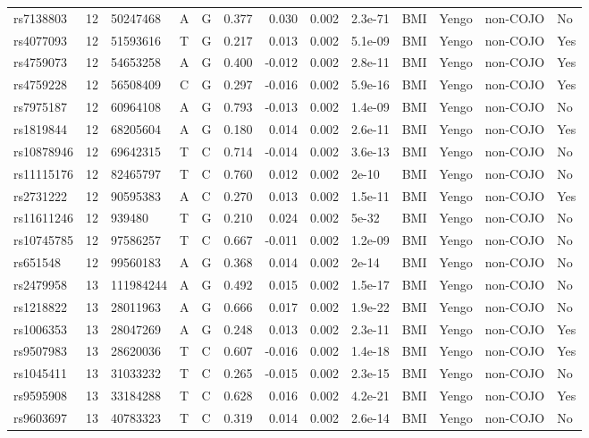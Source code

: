 \documentclass[11pt,twoside]{bristolthesis}
\begin{document}
\begin{longtable}[t]{lrlllrrrlllll}
rs7138803 & 12 & 50247468 & A & G & 0.377 & 0.030 & 0.002 & 2.3e-71 & BMI & Yengo & non-COJO & No\\
rs4077093 & 12 & 51593616 & T & G & 0.217 & 0.013 & 0.002 & 5.1e-09 & BMI & Yengo & non-COJO & Yes\\
rs4759073 & 12 & 54653258 & A & G & 0.400 & -0.012 & 0.002 & 2.8e-11 & BMI & Yengo & non-COJO & Yes\\
\addlinespace
rs4759228 & 12 & 56508409 & C & G & 0.297 & -0.016 & 0.002 & 5.9e-16 & BMI & Yengo & non-COJO & Yes\\
rs7975187 & 12 & 60964108 & A & G & 0.793 & -0.013 & 0.002 & 1.4e-09 & BMI & Yengo & non-COJO & No\\
rs1819844 & 12 & 68205604 & A & G & 0.180 & 0.014 & 0.002 & 2.6e-11 & BMI & Yengo & non-COJO & Yes\\
rs10878946 & 12 & 69642315 & T & C & 0.714 & -0.014 & 0.002 & 3.6e-13 & BMI & Yengo & non-COJO & No\\
rs11115176 & 12 & 82465797 & T & C & 0.760 & 0.012 & 0.002 & 2e-10 & BMI & Yengo & non-COJO & No\\
\addlinespace
rs2731222 & 12 & 90595383 & A & C & 0.270 & 0.013 & 0.002 & 1.5e-11 & BMI & Yengo & non-COJO & Yes\\
rs11611246 & 12 & 939480 & T & G & 0.210 & 0.024 & 0.002 & 5e-32 & BMI & Yengo & non-COJO & No\\
rs10745785 & 12 & 97586257 & T & C & 0.667 & -0.011 & 0.002 & 1.2e-09 & BMI & Yengo & non-COJO & No\\
rs651548 & 12 & 99560183 & A & G & 0.368 & 0.014 & 0.002 & 2e-14 & BMI & Yengo & non-COJO & No\\
rs2479958 & 13 & 111984244 & A & G & 0.492 & 0.015 & 0.002 & 1.5e-17 & BMI & Yengo & non-COJO & No\\
\addlinespace
rs1218822 & 13 & 28011963 & A & G & 0.666 & 0.017 & 0.002 & 1.9e-22 & BMI & Yengo & non-COJO & No\\
rs1006353 & 13 & 28047269 & A & G & 0.248 & 0.013 & 0.002 & 2.3e-11 & BMI & Yengo & non-COJO & Yes\\
rs9507983 & 13 & 28620036 & T & C & 0.607 & -0.016 & 0.002 & 1.4e-18 & BMI & Yengo & non-COJO & Yes\\
rs1045411 & 13 & 31033232 & T & C & 0.265 & -0.015 & 0.002 & 2.3e-15 & BMI & Yengo & non-COJO & No\\
rs9595908 & 13 & 33184288 & T & C & 0.628 & 0.016 & 0.002 & 4.2e-21 & BMI & Yengo & non-COJO & Yes\\
\addlinespace
rs9603697 & 13 & 40783323 & T & C & 0.319 & 0.014 & 0.002 & 2.6e-14 & BMI & Yengo & non-COJO & No\\

\end{longtable}
\end{document}

